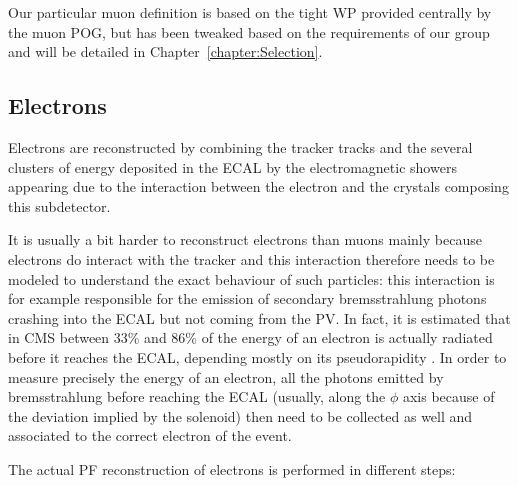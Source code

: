 \documentclass[a4paper, 10pt, openright]{report}
\begin{document}
Our particular muon definition is based on the tight \ac{WP} provided centrally by the muon \ac{POG}, but has been tweaked based on the requirements of our group and will be detailed in Chapter~\ref{chapter:Selection}.

\subsection{Electrons} \label{subsection:Electrons}

Electrons are reconstructed by combining the tracker tracks and the several clusters of energy deposited in the \ac{ECAL} by the electromagnetic showers appearing due to the interaction between the electron and the crystals composing this subdetector. 

It is usually a bit harder to reconstruct electrons than muons mainly because electrons do interact with the tracker and this interaction therefore needs to be modeled to understand the exact behaviour of such particles: this interaction is for example responsible for the emission of secondary bremsstrahlung photons crashing into the \ac{ECAL} but not coming from the \ac{PV}. In fact, it is estimated that in \ac{CMS} between 33\% and 86\% of the energy of an electron is actually radiated before it reaches the \ac{ECAL}, depending mostly on its pseudorapidity \cite{EleReco}. In order to measure precisely the energy of an electron, all the photons emitted by bremsstrahlung before reaching the \ac{ECAL} (usually, along the $\phi$ axis because of the deviation implied by the solenoid) then need to be collected as well and associated to the correct electron of the event.

The actual \ac{PF} reconstruction of electrons is performed in different steps:
\end{document}
